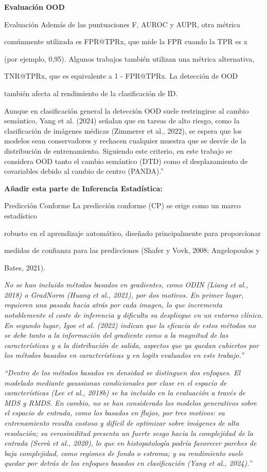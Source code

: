 \textbf{Evaluación OOD}

Evaluación Además de las puntuaciones F, AUROC y AUPR, otra métrica

comúnmente utilizada es FPR@TPRx, que mide la FPR cuando la TPR es x

(por ejemplo, 0,95). Algunos trabajos también utilizan una métrica
alternativa,

TNR@TPRx, que es equivalente a 1 - FPR@TPRx. La detección de OOD

también afecta al rendimiento de la clasificación de ID.

Aunque en clasificación general la detección OOD suele restringirse al
cambio semántico, Yang et al. (2024) señalan que en tareas de alto
riesgo, como la clasificación de imágenes médicas (Zimmerer et al.,
2022), se espera que los modelos sean conservadores y rechacen cualquier
muestra que se desvíe de la distribución de entrenamiento. Siguiendo
este criterio, en este trabajo se considera OOD tanto el cambio
semántico (DTD) como el desplazamiento de covariables debido al cambio
de centro (PANDA).''

\textbf{Añadir esta parte de Inferencia Estadística:}

Predicción Conforme La predicción conforme (CP) se erige como un marco
estadístico

robusto en el aprendizaje automático, diseñado principalmente para
proporcionar

medidas de confianza para las predicciones (Shafer y Vovk, 2008;
Angelopoulos y

Bates, 2021).

\emph{No se han incluido métodos basados en gradientes, como ODIN (Liang
et al., 2018) o GradNorm (Huang et al., 2021), por dos motivos. En
primer lugar, requieren una pasada hacia atrás por cada imagen, lo que
incrementa notablemente el coste de inferencia y dificulta su despliegue
en un entorno clínico. En segundo lugar, Igoe et al. (2022) indican que
la eficacia de estos métodos no se debe tanto a la información del
gradiente como a la magnitud de las características y a la distribución
de salida, aspectos que ya quedan cubiertos por los métodos basados en
características y en logits evaluados en este trabajo.''}

\emph{``Dentro de los métodos basados en densidad se distinguen dos
enfoques. El modelado mediante gaussianas condicionales por clase en el
espacio de características (Lee et al., 2018b) se ha incluido en la
evaluación a través de MDS y RMDS. En cambio, no se han considerado los
modelos generativos sobre el espacio de entrada, como los basados en
flujos, por tres motivos: su entrenamiento resulta costoso y difícil de
optimizar sobre imágenes de alta resolución; su verosimilitud presenta
un fuerte sesgo hacia la complejidad de la entrada (Serrà et al., 2020),
lo que en histopatología podría favorecer parches de baja complejidad,
como regiones de fondo o estroma; y su rendimiento suele quedar por
detrás de los enfoques basados en clasificación (Yang et al., 2024).''}


